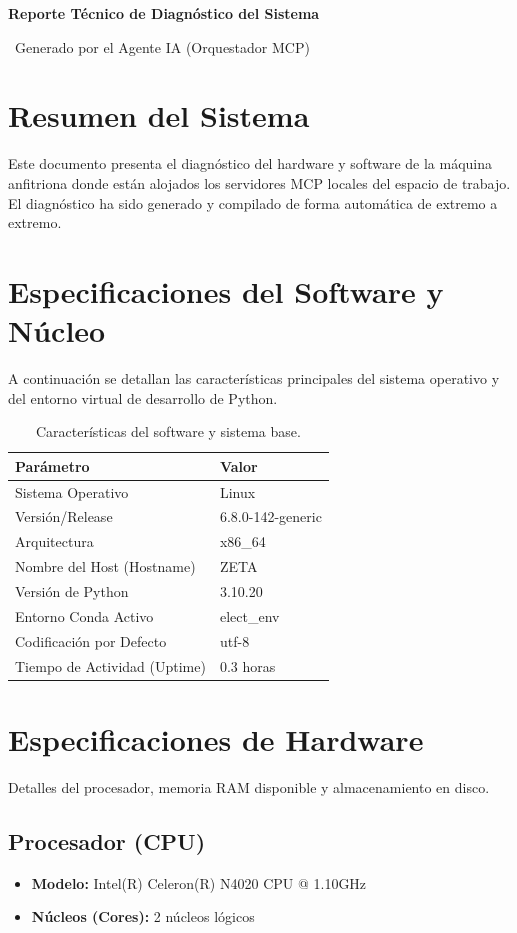 \documentclass[11pt,a4paper]{article}
\newcommand{\iconoBanda}{microchip}
\newcommand{\bandaTitulo}[3][fondoOscuro]{%
  \begin{tcolorbox}[
    enhanced,
    colback=#1, colframe=#1,
    boxrule=0pt, arc=8pt, outer arc=8pt,
    width=\linewidth,
    top=18pt, bottom=6pt, left=14pt, right=14pt,
    borderline south={3.5pt}{0pt}{cyanNeon},
  ]
    \begin{minipage}[c]{0.07\linewidth}
      \centering
      \textcolor{cyanNeon}{\fontsize{30}{30}\selectfont\faIcon{\iconoBanda}}
    \end{minipage}%
    \hspace{8pt}%
    \begin{minipage}[c]{0.88\linewidth}
      {\fontsize{20}{24}\selectfont\bfseries\color{white}#2}\par\vspace{5pt}%
      \textcolor{cyanNeon!80!white}{\small\faIcon{angle-right}~#3}%
    \end{minipage}
    \vspace{4pt}
  \end{tcolorbox}%
  \vspace{8pt}%
}
\begin{document}
\bandaTitulo{Reporte Técnico de Diagnóstico del Sistema}{Generado por el Agente IA (Orquestador MCP)}

\section{Resumen del Sistema}
Este documento presenta el diagnóstico del hardware y software de la máquina anfitriona donde están alojados los servidores MCP locales del espacio de trabajo. El diagnóstico ha sido generado y compilado de forma automática de extremo a extremo.

\section{Especificaciones del Software y Núcleo}
A continuación se detallan las características principales del sistema operativo y del entorno virtual de desarrollo de Python.

\begin{table}[h!]
\centering
\begin{tabular}{ll}
\hline
\textbf{Parámetro} & \textbf{Valor} \\ \hline
Sistema Operativo & Linux \\
Versión/Release & 6.8.0-142-generic \\
Arquitectura & x86\_64 \\
Nombre del Host (Hostname) & ZETA \\
Versión de Python & 3.10.20 \\
Entorno Conda Activo & elect\_env \\
Codificación por Defecto & utf-8 \\
Tiempo de Actividad (Uptime) & 0.3 horas \\ \hline
\end{tabular}
\caption{Características del software y sistema base.}
\end{table}

\section{Especificaciones de Hardware}
Detalles del procesador, memoria RAM disponible y almacenamiento en disco.

\subsection{Procesador (CPU)}
\begin{itemize}
    \item \textbf{Modelo:} Intel(R) Celeron(R) N4020 CPU @ 1.10GHz
    \item \textbf{Núcleos (Cores):} 2 núcleos lógicos
\end{itemize}
\end{document}
